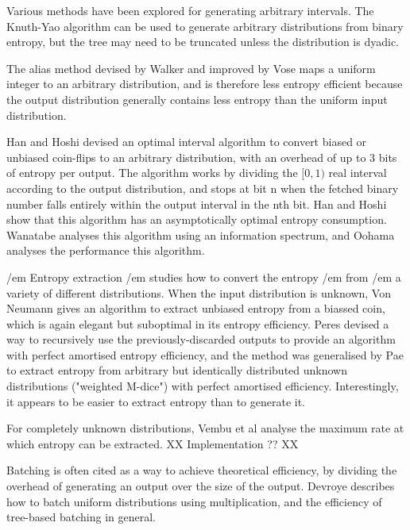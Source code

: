 \documentclass[12pt]{article}
\begin{document}
Various methods have been explored for generating arbitrary intervals.
The Knuth-Yao algorithm can be used to generate arbitrary distributions from binary entropy, but the tree may need to be truncated unless the distribution is dyadic.

The alias method devised by Walker \cite{walker1977efficient} and improved by Vose \cite{vose91} maps a uniform integer to an arbitrary distribution, and is therefore less entropy efficient because the output distribution generally contains less entropy than the uniform input distribution.

Han and Hoshi \cite{han97} devised an optimal interval algorithm to convert biased or unbiased coin-flips to an arbitrary distribution, with an overhead of up to 3 bits of entropy per output.  The algorithm works by dividing the $[0,1)$ real interval according to the output distribution, and stops at bit n when the fetched binary number falls entirely within the output interval in the nth bit. Han and Hoshi show that this algorithm has an asymptotically optimal entropy consumption. 
Wanatabe \cite{wanatabe20} analyses this algorithm using an information spectrum, and Oohama \cite{oohama11, oohama2020performance} analyses the performance this algorithm.

/em Entropy extraction /em studies how to convert the entropy /em from /em a variety of different distributions. When the input distribution is unknown, Von Neumann \cite{neumann51} gives an algorithm to extract unbiased entropy from a biassed coin, which is again elegant but suboptimal in its entropy efficiency. Peres \cite{peres1992iterating} devised a way to recursively use the previously-discarded outputs to provide an algorithm with perfect amortised entropy efficiency, and the method was generalised by Pae \cite{pae15} to extract entropy from arbitrary but identically distributed unknown distributions ("weighted M-dice") with perfect amortised efficiency. Interestingly, it appears to be easier to extract entropy than to generate it.

For completely unknown distributions, Vembu et al \cite{vembu95} analyse the maximum rate at which entropy can be extracted. XX Implementation ?? XX

Batching is often cited as a way to achieve theoretical efficiency, by dividing the overhead of generating an output over the size of the output. Devroye \cite{devroye86} describes how to batch uniform distributions using multiplication, and the efficiency of tree-based batching in general.
\end{document}
